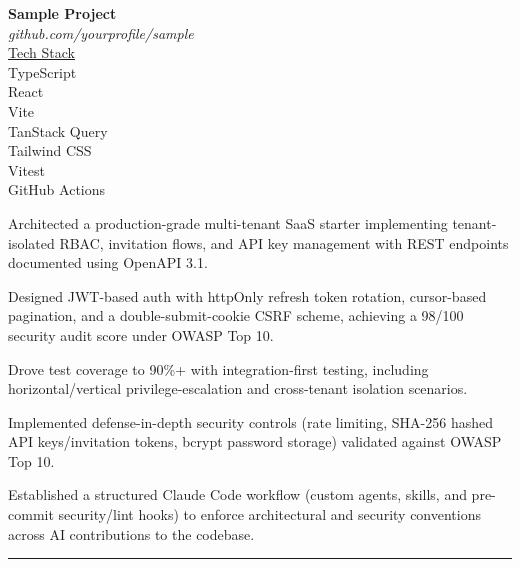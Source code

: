 \documentclass[10pt]{article}
\newcommand{\sectionlabel}[1]{%
  \par\vspace{-8pt}%
  \noindent\textcolor{lightgray}{\rule{\textwidth}{0.3pt}}\par\vspace{-2pt}%
  \noindent{\bfseries\large #1}\par\vspace{-4pt}%
}
\newcommand{\projectmeta}[3]{%
  \textbf{#1}\\
  \textit{#2}\\[4pt]
  {\underline{\color{lighttext}Tech Stack}}\\
  {\color{lighttext}#3}%
}
\begin{document}
\begin{entryrow}
  {\projectmeta
    {Sample Project}
    {github.com/yourprofile/sample}
    {
      TypeScript\\
      React\\
      Vite\\
      TanStack Query\\
      Tailwind CSS\\
      Vitest\\
      GitHub Actions\\
    }
  }
  \begin{resumeitems}
    \item Architected a production-grade multi-tenant SaaS starter implementing tenant-isolated RBAC, invitation flows, and API key management with REST endpoints documented using OpenAPI 3.1.
    \item Designed JWT-based auth with httpOnly refresh token rotation, cursor-based pagination, and a double-submit-cookie CSRF scheme, achieving a 98/100 security audit score under OWASP Top 10.
    \item Drove test coverage to 90\%+ with integration-first testing, including horizontal/vertical privilege-escalation and cross-tenant isolation scenarios.
    \item Implemented defense-in-depth security controls (rate limiting, SHA-256 hashed API keys/invitation tokens, bcrypt password storage) validated against OWASP Top 10.
    \item Established a structured Claude Code workflow (custom agents, skills, and pre-commit security/lint hooks) to enforce architectural and security conventions across AI contributions to the codebase.
  \end{resumeitems}
\end{entryrow}

\sectionlabel{Employment History}
\end{document}
